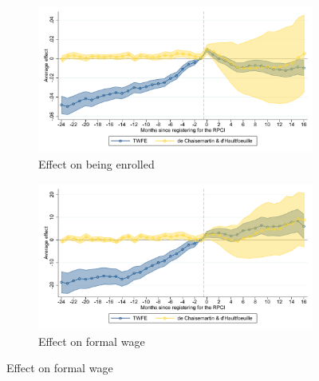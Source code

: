 \documentclass[oneside,11pt]{article}
\begin{document}
\begin{figure}[H]
    \centering
    \caption{Event studies - RPCI effect on enrollment and wages \label{fig:event_study_rpci}}
    
    \begin{subfigure}{0.49\textwidth}
    \caption{Effect on being enrolled}
    \includegraphics[width=\textwidth]{04_Figures/muestra_10porciento/event_study_alta_connected.pdf}
    \end{subfigure}
    \begin{subfigure}{0.49\textwidth}
    \caption{Effect on formal wage}
    \includegraphics[width=\textwidth]{04_Figures/muestra_10porciento/event_study_sal_formal_connected.pdf}
    \end{subfigure}
    

\end{figure}
\end{document}
